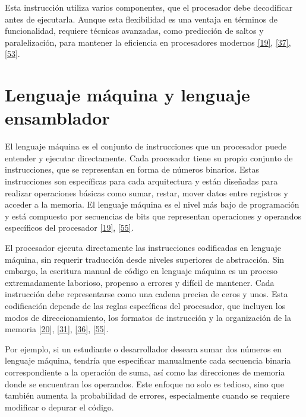 \documentclass[12pt,oneside]{templates/unerthesis}
\begin{document}
Esta instrucción utiliza varios componentes, que el procesador debe decodificar antes de ejecutarla. Aunque esta flexibilidad es una ventaja en términos de funcionalidad, requiere técnicas avanzadas, como predicción de saltos y paralelización, para mantener la eficiencia en procesadores modernos \protect\hyperlink{ref-hennessy2017computer}{{[}19{]}}, \protect\hyperlink{ref-patterson_computer_2014}{{[}37{]}}, \protect\hyperlink{ref-brey_intel_microprocessors}{{[}53{]}}.

\hypertarget{lenguaje-muxe1quina-y-lenguaje-ensamblador}{%
\section{Lenguaje máquina y lenguaje ensamblador}\label{lenguaje-muxe1quina-y-lenguaje-ensamblador}}

El lenguaje máquina es el conjunto de instrucciones que un procesador puede entender y ejecutar directamente. Cada procesador tiene su propio conjunto de instrucciones, que se representan en forma de números binarios. Estas instrucciones son específicas para cada arquitectura y están diseñadas para realizar operaciones básicas como sumar, restar, mover datos entre registros y acceder a la memoria. El lenguaje máquina es el nivel más bajo de programación y está compuesto por secuencias de bits que representan operaciones y operandos específicos del procesador
\protect\hyperlink{ref-hennessy2017computer}{{[}19{]}}, \protect\hyperlink{ref-irvine2011assembly}{{[}55{]}}.

El procesador ejecuta directamente las instrucciones codificadas en lenguaje máquina, sin requerir traducción desde niveles superiores de abstracción. Sin embargo, la escritura manual de código en lenguaje máquina es un proceso extremadamente laborioso, propenso a errores y difícil de mantener. Cada instrucción debe representarse como una cadena precisa de ceros y unos. Esta codificación depende de las reglas específicas del procesador, que incluyen los modos de direccionamiento, los formatos de instrucción y la organización de la memoria \protect\hyperlink{ref-stallings_computer_2021}{{[}20{]}}, \protect\hyperlink{ref-tanenbaum_structured_2016}{{[}31{]}}, \protect\hyperlink{ref-null_essentials_2023}{{[}36{]}}, \protect\hyperlink{ref-irvine2011assembly}{{[}55{]}}.

Por ejemplo, si un estudiante o desarrollador deseara sumar dos números en lenguaje máquina, tendría que especificar manualmente cada secuencia binaria correspondiente a la operación de suma, así como las direcciones de memoria donde se encuentran los operandos. Este enfoque no solo es tedioso, sino que también aumenta la probabilidad de errores, especialmente cuando se requiere modificar o depurar el código.
\end{document}
